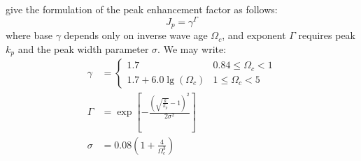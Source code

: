 \citeauthor{article:Elfouhaily1997} give the \wavenumber formulation of the
peak enhancement factor as follows:
\begin{equation*}
J_p = \gamma^{\Gamma}
\end{equation*}
where base $\gamma$ depends only on inverse wave age $\Omega_c$, and exponent
$\Gamma$ requires peak \wavenumber $k_p$ and the peak width parameter $\sigma$.
We may write:
\begin{align*}
\gamma &= \begin{cases}
	1.7 & 0.84 \leq \Omega_c < 1 \\
	1.7 + 6.0\lg(\Omega_c) & 1\leq\Omega_c < 5
	\end{cases} \\
\Gamma &= \exp\left[-\frac{\left(\sqrt{\frac{k}{k_p}}-1\right)^2}{2\sigma^2}\right] \\
\sigma &= 0.08\left(1 + \frac{4}{\Omega_c^3}\right)
\end{align*}
%
